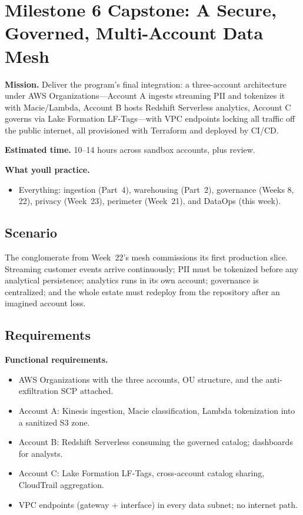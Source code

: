 \section{Milestone 6 Capstone: A Secure, Governed, Multi-Account Data Mesh}\label{sec:ch24-capstone}

\begin{capstonebox}
\textbf{Mission.} Deliver the program's final integration: a three-account architecture under AWS Organizations---Account A ingests streaming PII and tokenizes it with Macie/Lambda, Account B hosts Redshift Serverless analytics, Account C governs via Lake Formation LF-Tags---with VPC endpoints locking all traffic off the public internet, all provisioned with Terraform and deployed by CI/CD.

\textbf{Estimated time.} 10--14 hours across sandbox accounts, plus review.

\textbf{What you\textquotesingle{}ll practice.}
\begin{itemize}
    \item Everything: ingestion (Part~4), warehousing (Part~2), governance (Weeks 8, 22), privacy (Week~23), perimeter (Week~21), and DataOps (this week).
\end{itemize}
\end{capstonebox}

\subsection*{Scenario}
The conglomerate from Week~22's mesh commissions its first production slice. Streaming customer events arrive continuously; PII must be tokenized before any analytical persistence; analytics runs in its own account; governance is centralized; and the whole estate must redeploy from the repository after an imagined account loss.

\subsection*{Requirements}
\textbf{Functional requirements.}
\begin{itemize}
    \item AWS Organizations with the three accounts, OU structure, and the anti-exfiltration SCP attached.
    \item Account A: Kinesis ingestion, Macie classification, Lambda tokenization into a sanitized S3 zone.
    \item Account B: Redshift Serverless consuming the governed catalog; dashboards for analysts.
    \item Account C: Lake Formation LF-Tags, cross-account catalog sharing, CloudTrail aggregation.
    \item VPC endpoints (gateway + interface) in every data subnet; no internet path.
\end{itemize}

